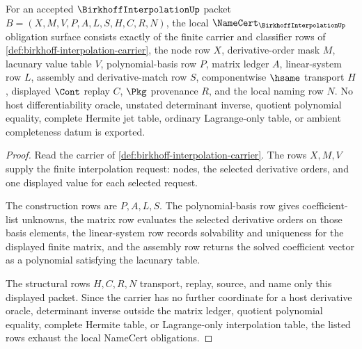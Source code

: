 \begin{theorem}
\label{thm:birkhoff-interpolation-namecert-obligations}
For an accepted $\BirkhoffInterpolationUp$ packet $B=(X,M,V,P,A,L,S,H,C,R,N)$, the local $\NameCert_{\BirkhoffInterpolationUp}$ obligation surface consists exactly of the finite carrier and classifier rows of \autoref{def:birkhoff-interpolation-carrier}, the node row $X$, derivative-order mask $M$, lacunary value table $V$, polynomial-basis row $P$, matrix ledger $A$, linear-system row $L$, assembly and derivative-match row $S$, componentwise $\hsame$ transport $H$, displayed $\Cont$ replay $C$, $\Pkg$ provenance $R$, and the local naming row $N$. No host differentiability oracle, unstated determinant inverse, quotient polynomial equality, complete Hermite jet table, ordinary Lagrange-only table, or ambient completeness datum is exported.
\end{theorem}
\begin{proof}
Read the carrier of \autoref{def:birkhoff-interpolation-carrier}. The rows $X,M,V$ supply the finite interpolation request: nodes, the selected derivative orders, and one displayed value for each selected request.

The construction rows are $P,A,L,S$. The polynomial-basis row gives coefficient-list unknowns, the matrix row evaluates the selected derivative orders on those basis elements, the linear-system row records solvability and uniqueness for the displayed finite matrix, and the assembly row returns the solved coefficient vector as a polynomial satisfying the lacunary table.

The structural rows $H,C,R,N$ transport, replay, source, and name only this displayed packet. Since the carrier has no further coordinate for a host derivative oracle, determinant inverse outside the matrix ledger, quotient polynomial equality, complete Hermite table, or Lagrange-only interpolation table, the listed rows exhaust the local NameCert obligations.
\end{proof}

